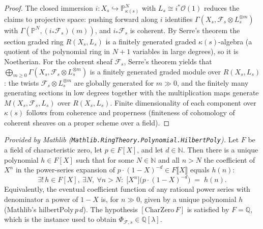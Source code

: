 \begin{proof}
  The closed immersion \(i : X_s \hookrightarrow \mathbb{P}^N_{\kappa(s)}\)
  with \(L_s \cong i^* \mathcal{O}(1)\) reduces the claims to projective
  space: pushing forward along \(i\) identifies
  \(\Gamma(X_s, \mathcal{F}_s \otimes L_s^{\otimes m})\) with
  \(\Gamma(\mathbb{P}^N, (i_* \mathcal{F}_s)(m))\), and \(i_* \mathcal{F}_s\)
  is coherent. By Serre's theorem the section
  graded ring \(R(X_s, L_s)\) is a finitely generated graded
  \(\kappa(s)\)-algebra (a quotient of the polynomial ring in \(N+1\)
  variables in large degrees), so it is Noetherian. For the coherent sheaf
  \(\mathcal{F}_s\), Serre's theorem yields that
  \(\bigoplus_{m \ge 0} \Gamma(X_s, \mathcal{F}_s \otimes L_s^{\otimes m})\) is a
  finitely generated graded module over \(R(X_s, L_s)\): the twists
  \(\mathcal{F}_s \otimes L_s^{\otimes m}\) are globally generated for
  \(m \gg 0\), and the finitely many generating sections in low degrees together
  with the multiplication maps generate \(M(X_s, \mathcal{F}_s, L_s)\) over
  \(R(X_s, L_s)\). Finite dimensionality of each component over \(\kappa(s)\)
  follows from coherence and properness (finiteness of cohomology of coherent
  sheaves on a proper scheme over a field).
\end{proof}

\begin{lemma}
  \label{lem:hilbertPoly_exists_mathlib}
  \mathlibok
  \textit{Provided by Mathlib
  (\texttt{Mathlib.RingTheory.Polynomial.HilbertPoly}).}
  Let \(F\) be a field of characteristic zero, let \(p \in F[X]\), and let
  \(d \in \mathbb{N}\). Then there is a unique polynomial \(h \in F[X]\) such that
  for some \(N \in \mathbb{N}\) and all \(n > N\) the coefficient of \(X^n\) in the
  power-series expansion of \(p \cdot (1 - X)^{-d} \in F\llbracket X\rrbracket\)
  equals \(h(n)\):
  \[
    \exists!\, h \in F[X],\ \exists N,\ \forall n > N : \;
    \bigl[ X^n \bigr]\bigl( p \cdot (1-X)^{-d} \bigr) \;=\; h(n).
  \]
  Equivalently, the eventual coefficient function of any rational power series
  with denominator a power of \(1 - X\) is, for \(n \gg 0\), given by a unique
  polynomial \(h\) (Mathlib's \(\mathrm{hilbertPoly}\,p\,d\)). The hypothesis
  \([\mathrm{CharZero}\,F]\) is satisfied by \(F = \mathbb{Q}\), which is the
  instance used to obtain \(\Phi_{\mathcal{F},s} \in \mathbb{Q}[\lambda]\).
\end{lemma}

